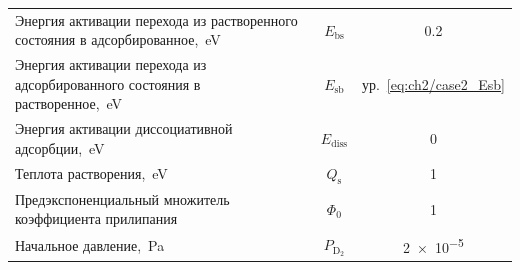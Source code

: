 \begin{table}[t!]
\begin{threeparttable}
\begin{tabularx}{\textwidth}{@{}>{\raggedright}Xcc}
            Энергия активации перехода из растворенного состояния в адсорбированное,~\si{\electronvolt}                 & $E_\mathrm{bs}$       & \num{0.2}                    \\
            Энергия активации перехода из адсорбированного состояния в растворенное,~\si{\electronvolt}                 & $E_\mathrm{sb}$       & ур.~\cref{eq:ch2/case2_Esb}  \\
            Энергия активации диссоциативной адсорбции,~\si{\electronvolt}                                              & $E_\mathrm{diss} $    & \num{0}                      \\
            Теплота растворения,~\si{\electronvolt}                                                                     & $Q_\mathrm{s}$        & \num{1}                      \\
            Предэкспоненциальный множитель коэффициента прилипания                                                      & $\Phi_0$              & \num{1}                      \\
            Начальное давление,~\si{\pascal}                                                                            & $P_\mathrm{D_2}$      & \num{2e-5}                   \\
            \bottomrule
        \end{tabularx}
    \end{threeparttable}
\end{table}


